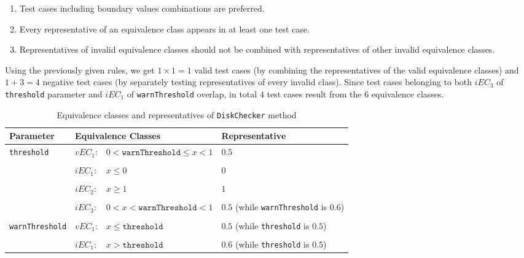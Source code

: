 \documentclass[conference, onecolumn]{IEEEtran}
\begin{document}
\begin{enumerate}
\item Test cases including boundary values combinations are preferred.
\item Every representative of an equivalence class appears in at least one test case.
\item Representatives of invalid equivalence classes should not be combined with representatives of other invalid equivalence classes.
\end{enumerate}

Using the previously given rules, we get $1 \times 1 = 1$ valid test cases (by combining the representatives of the valid equivalence classes) and $1 + 3 = 4$ negative test cases
(by separately testing representatives of every invalid class). Since test cases belonging to both $iEC_3$ of  \texttt{threshold} parameter and $iEC_1$ of \texttt{warnThreshold} overlap, in total $4$ test cases result from the $6$ equivalence classes.

\begin{table*}
  \caption{Equivalence classes and representatives of \texttt{DiskChecker} method}
  \label{tab:DiskCheckerEqClass}
  \centering
  \begin{tabular}{llp{6.5cm}p{8cm}}
    \toprule
    \textbf{Parameter} & \multicolumn{2}{|l|}{\textbf{Equivalence Classes}} & \textbf{Representative} \\
    \midrule
    
	\multirow{3}{*}{\texttt{threshold}} & $vEC_1$: & $0 < \texttt{warnThreshold} \leq x < 1$  & $0.5$ \\    
    
    \\[-1em] 
    & $iEC_1$: & $x \leq 0$ & $0$ \\ 
    
    \\[-1em]
    & $iEC_2$: & $x \geq 1$ & $1$ \\
    
    \\[-1em]
    & $iEC_3$: & $0 < x < \texttt{warnThreshold} < 1$ & $0.5$ (while \texttt{warnThreshold} is $0.6$) \\
    
    \\[-1em] \hline 
	   
    \multirow{3}{*}{\texttt{warnThreshold}} & $vEC_1$: & $x \leq \texttt{threshold}$  & $0.5$ (while \texttt{threshold} is $0.5$) \\    
    
    \\[-1em] 
    & $iEC_1$: & $x > \texttt{threshold}$ & $0.6$ (while \texttt{threshold} is $0.5$) \\  
    
    \bottomrule
  \end{tabular}
\end{table*}
\end{document}

